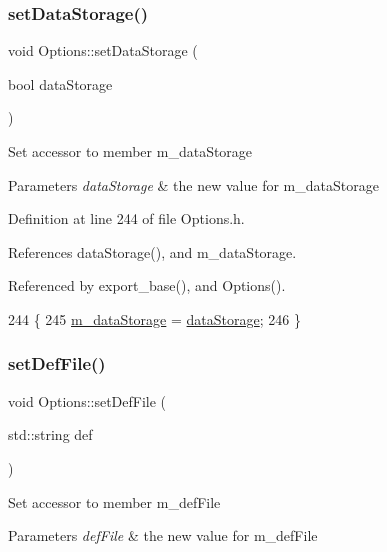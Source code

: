 \subsubsection{\texorpdfstring{set\+Data\+Storage()}{setDataStorage()}}
{\footnotesize\ttfamily void Options\+::set\+Data\+Storage (\begin{DoxyParamCaption}\item[{bool}]{data\+Storage }\end{DoxyParamCaption})\hspace{0.3cm}{\ttfamily [inline]}}

Set accessor to member m\+\_\+data\+Storage 
\begin{DoxyParams}{Parameters}
{\em data\+Storage} & the new value for m\+\_\+data\+Storage \\
\hline
\end{DoxyParams}


Definition at line 244 of file Options.\+h.



References data\+Storage(), and m\+\_\+data\+Storage.



Referenced by export\+\_\+base(), and Options().


\begin{DoxyCode}
244                                                \{
245                 \hyperlink{classOptions_a244898bb30c9f716bdc335b4d85d1dfb}{m\_dataStorage} = \hyperlink{classOptions_aed7799d10139fa542055b982cb820192}{dataStorage};
246         \}
\end{DoxyCode}
\mbox{\label{classOptions_a3c8bed9867ac5805489d78061e55bd1a}} 
\subsubsection{\texorpdfstring{set\+Def\+File()}{setDefFile()}}
{\footnotesize\ttfamily void Options\+::set\+Def\+File (\begin{DoxyParamCaption}\item[{std\+::string}]{def }\end{DoxyParamCaption})\hspace{0.3cm}{\ttfamily [inline]}}

Set accessor to member m\+\_\+def\+File 
\begin{DoxyParams}{Parameters}
{\em def\+File} & the new value for m\+\_\+def\+File \\
\hline
\end{DoxyParams}


